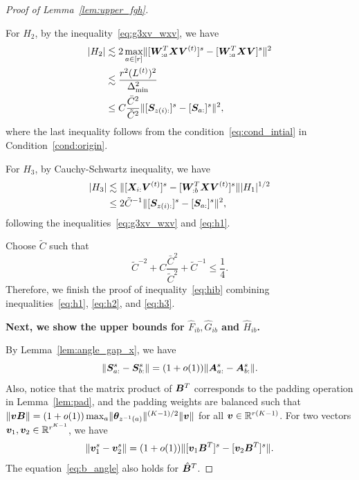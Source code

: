 \documentclass[journal]{IEEEtran}
\theoremstyle{definition}
\theoremstyle{definition}
\begin{document}
\begin{proof}[Proof of Lemma~\ref{lem:upper_fgh}]
\begin{enumerate}[wide]
    For $H_2$, by the inequality~\eqref{eq:g3xv_wxv}, we have 
    \begin{align}
        |H_2| &\lesssim 2\max_{a \in [r]}\onormSize{}{[\mW_{:a}^T\mX \mV^{(t)}]^s - [\mW_{:a}^T\mX \mV]^s }^2 \\
        &\lesssim \frac{r^2 (L^{(t)})^2}{\Delta_{\min}^2} \\
        &\leq C \frac{\bar C^2}{ \tilde C^2} \onormSize{}{ [ \mS_{z(i):} ]^s - [ \mS_{a:}]^s }^2, \label{eq:h2}
    \end{align}
    where the last inequality follows from the condition~\eqref{eq:cond_intial} in Condition~\ref{cond:origin}.
    
      For $H_3$,  by Cauchy-Schwartz inequality, we have 
      \begin{align}
           |H_3| & \lesssim \onormSize{}{[\mX_{i:} \mV^{(t)}]^s  -  [  \mW_{:b}^T \mX \mV^{(t)} ]^s} |H_1|^{1/2} \\
           &\leq 2 \tilde C^{-1} \onormSize{}{ [ \mS_{z(i):} ]^s - [ \mS_{a:}]^s }^2,\label{eq:h3}
      \end{align}
    following the inequalities~\eqref{eq:g3xv_wxv} and \eqref{eq:h1}.
    
    Choose $\tilde C$ such that 
    \begin{equation}\label{eq:tilde_c2}
        \tilde C^{-2} + C \frac{\bar C^2}{ \tilde C^2} + \tilde C^{-1} \leq \frac{1}{4}.
    \end{equation}
     Therefore, we finish the proof of inequality~\eqref{eq:hib} combining inequalities~\eqref{eq:h1}, \eqref{eq:h2}, and \eqref{eq:h3}.

\end{enumerate}
{
  
\textbf{Next, we show the upper bounds for $\hat F_{ib}, \hat G_{ib}$ and $\hat H_{ib}$.}

By Lemma~\ref{lem:angle_gap_x}, we have 
\begin{equation}
    \lVert\bm S_{a:}^s - \bm S_{b:}^s\rVert  = (1 + o(1)) \lVert\bm A_{a:}^s - \bm A_{b:}^s\rVert.
\end{equation}
Also, notice that the matrix product of $ \bm B^T$ corresponds to the padding operation in Lemma~\ref{lem:pad}, and the padding weights are balanced such that $\lVert\bm{v} \bm B\rVert  = (1 + o(1)) \max_{a} \lVert\boldsymbol{\theta}_{z^{-1}(a)}\rVert^{(K-1)/2} \lVert\bm{v}\rVert $ for all $\bm{v} \in \mathbb{R}^{r(K-1)}$. For two vectors $\bm{v}_1, \bm{v}_2 \in \mathbb{R}^{r^{K-1}}$, we have 
\begin{equation}\label{eq:b_angle}
    \onormSize{}{\mv_1^s - \mv_2^s} = (1 + o(1)) \onormSize{}{[\mv_1 \mB^T]^s -  [\mv_2 \mB^T]^s  }.
\end{equation}
The equation~\eqref{eq:b_angle} also holds for $\hat {\bm B}^T$.

}
\end{proof}
\end{document}
